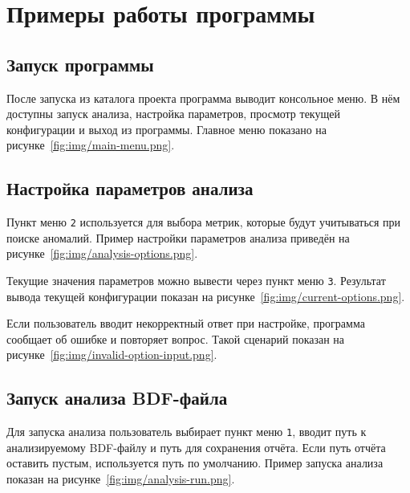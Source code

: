 \section{Примеры работы программы}
\label{sec:examples}

\subsection{Запуск программы}

После запуска из каталога проекта программа выводит консольное меню. В нём доступны запуск анализа, настройка параметров, просмотр текущей конфигурации и выход из программы. Главное меню показано на рисунке~\ref{fig:img/main-menu.png}.


\subsection{Настройка параметров анализа}

Пункт меню \texttt{2} используется для выбора метрик, которые будут учитываться при поиске аномалий. Пример настройки параметров анализа приведён на рисунке~\ref{fig:img/analysis-options.png}.


Текущие значения параметров можно вывести через пункт меню \texttt{3}. Результат вывода текущей конфигурации показан на рисунке~\ref{fig:img/current-options.png}.


Если пользователь вводит некорректный ответ при настройке, программа сообщает об ошибке и повторяет вопрос. Такой сценарий показан на рисунке~\ref{fig:img/invalid-option-input.png}.


\subsection{Запуск анализа BDF-файла}

Для запуска анализа пользователь выбирает пункт меню \texttt{1}, вводит путь к анализируемому BDF-файлу и путь для сохранения отчёта. Если путь отчёта оставить пустым, используется путь по умолчанию. Пример запуска анализа показан на рисунке~\ref{fig:img/analysis-run.png}.

